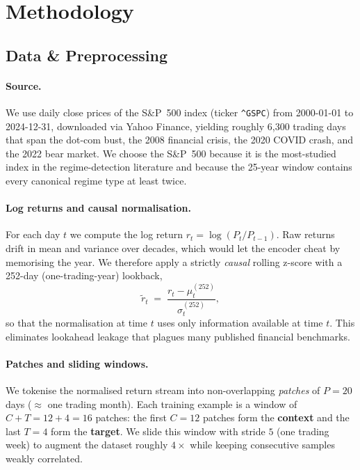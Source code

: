 \documentclass[twocolumn, 10pt]{article}
\begin{document}
\section{Methodology}
\label{sec:methods}

\subsection{Data \& Preprocessing}
\label{sec:data}

\paragraph{Source.}
We use daily close prices of the S\&P~500 index (ticker \texttt{\^{}GSPC})
from 2000-01-01 to 2024-12-31, downloaded via Yahoo Finance, yielding
roughly 6{,}300 trading days that span the dot-com bust, the 2008
financial crisis, the 2020 COVID crash, and the 2022 bear market. We
choose the S\&P~500 because it is the most-studied index in the
regime-detection literature and because the 25-year window contains every
canonical regime type at least twice.

\paragraph{Log returns and causal normalisation.}
For each day $t$ we compute the log return $r_t = \log(P_t / P_{t-1})$.
Raw returns drift in mean and variance over decades, which would let the
encoder cheat by memorising the year. We therefore apply a strictly
\emph{causal} rolling z-score with a 252-day (one-trading-year) lookback,
\[
  \tilde{r}_t \;=\; \frac{r_t - \mu_t^{(252)}}{\sigma_t^{(252)}},
\]
so that the normalisation at time $t$ uses only information available at
time $t$. This eliminates lookahead leakage that plagues many published
financial benchmarks.

\paragraph{Patches and sliding windows.}
We tokenise the normalised return stream into non-overlapping
\emph{patches} of $P=20$ days ($\approx$ one trading month). Each training
example is a window of $C+T=12+4=16$ patches: the first $C=12$ patches
form the \textbf{context} and the last $T=4$ form the \textbf{target}.
We slide this window with stride $5$ (one trading week) to augment the
dataset roughly $4\times$ while keeping consecutive samples weakly
correlated.
\end{document}
